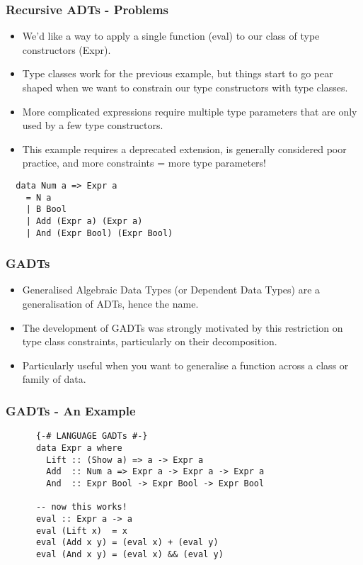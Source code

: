 \documentclass{beamer}
\begin{document}
\begin{frame}[fragile]
\frametitle{Recursive ADTs - Problems}
\begin{itemize}
\item We'd like a way to apply a single function (eval) to our class of type
  constructors (Expr).
\item Type classes work for the previous example, but things start to go pear
  shaped when we want to constrain our type constructors with type classes.
\item More complicated expressions require multiple type parameters that are
only used by a few type constructors.
\item This example requires a deprecated extension, is generally
considered poor practice, and more constraints = more type parameters! \\
\end{itemize}
\begin{minipage}{1\textwidth}
  \begin{verbatim}
  data Num a => Expr a
    = N a
    | B Bool
    | Add (Expr a) (Expr a)
    | And (Expr Bool) (Expr Bool)
  \end{verbatim}
\end{minipage}
\end{frame}

\begin{frame}[fragile]
\frametitle{GADTs}
  \begin{itemize}
    \item Generalised Algebraic Data Types (or Dependent Data Types) are a
      generalisation of ADTs, hence the name.
    \item The development of GADTs was strongly motivated by this restriction
      on type class constraints, particularly on their decomposition.
    \item Particularly useful when you want to generalise a function across a 
      class or family of data.
  \end{itemize}
  \begin{minipage}{1\textwidth}
  \end{minipage}
\end{frame}

\begin{frame}[fragile]
\frametitle{GADTs - An Example}
  \begin{minipage}{1\textwidth}
    \begin{verbatim}
      {-# LANGUAGE GADTs #-}
      data Expr a where
        Lift :: (Show a) => a -> Expr a
        Add  :: Num a => Expr a -> Expr a -> Expr a
        And  :: Expr Bool -> Expr Bool -> Expr Bool

      -- now this works!
      eval :: Expr a -> a
      eval (Lift x)  = x
      eval (Add x y) = (eval x) + (eval y)
      eval (And x y) = (eval x) && (eval y)
    \end{verbatim}
  \end{minipage}
\end{frame}
\end{document}
